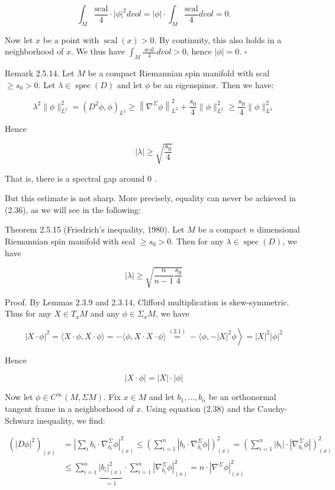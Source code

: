 \documentclass[10pt, letterpaper]{article}
\begin{document}
$$
\int_{M} \frac{\mathrm{scal}}{4} \cdot|\phi|^{2} d v o l=|\phi| \cdot \int_{M} \frac{\mathrm{scal}}{4} d v o l=0 .
$$

Now let $x$ be a point with $\operatorname{scal}(x)>0$. By continuity, this also holds in a neighborhood of $x$. We thus have $\int_{M} \frac{\text { scal }}{4} d v o l>0$, hence $|\phi|=0$. \(\square\)

Remark 2.5.14. Let $M$ be a compact Riemannian spin manifold with scal $\geq s_{0}>0$. Let $\lambda \in \operatorname{spec}(D)$ and let $\phi$ be an eigenspinor. Then we have:

$$
\lambda^{2}\|\phi\|_{L^{2}}^{2}=\left(D^{2} \phi, \phi\right)_{L^{2}} \geq\left\|\nabla^{\Sigma} \phi\right\|_{L^{2}}^{2}+\frac{s_{0}}{4}\|\phi\|_{L^{2}}^{2} \geq \frac{s_{0}}{4}\|\phi\|_{L^{2}}^{2}
$$

Hence

$$
|\lambda| \geq \sqrt{\frac{s_{0}}{4}}
$$

That is, there is a spectral gap around 0 .

But this estimate is not sharp. More precisely, equality can never be achieved in (2.36), as we will see in the following:

Theorem 2.5.15 (Friedrich's inequality, 1980). Let $M$ be a compact $n$ dimensional Riemannian spin manifold with scal $\geq s_{0}>0$. Then for any $\lambda \in \operatorname{spec}(D)$, we have

$$
|\lambda| \geq \sqrt{\frac{n}{n-1} \frac{s_{0}}{4}}
$$

Proof. By Lemmas 2.3.9 and 2.3.14, Clifford multiplication is skew-symmetric. Thus for any $X \in T_{x} M$ and any $\phi \in \Sigma_{x} M$, we have

$$
\left.|X \cdot \phi|^{2}=\langle X \cdot \phi, X \cdot \phi\rangle=-\langle\phi, X \cdot X \cdot \phi\rangle \stackrel{(2.1)}{=}-\left.\langle\phi,-| X\right|^{2} \phi\right\rangle=|X|^{2}|\phi|^{2}
$$

Hence

$$
|X \cdot \phi|=|X| \cdot|\phi|
$$

Now let $\phi \in C^{\infty}(M, \Sigma M)$. Fix $x \in M$ and let $b_{1}, \ldots, b_{n}$ be an orthonormal tangent frame in a neighborhood of $x$. Using equation (2.38) and the Cauchy-Schwarz inequality, we find:

$$
\begin{aligned}
\left(|D \phi|^{2}\right)_{(x)} & =\left|\sum_{i} b_{i} \cdot \nabla_{b_{i}}^{\Sigma} \phi\right|_{(x)}^{2} \leq\left(\sum_{i=1}^{n}\left|b_{i} \cdot \nabla_{b_{i}}^{\Sigma} \phi\right|\right)_{(x)}^{2}=\left(\sum_{i=1}^{n}\left|b_{i}\right| \cdot\left|\nabla_{b_{i}}^{\Sigma} \phi\right|\right)_{(x)}^{2} \\
& \leq \sum_{i=1}^{n} \underbrace{\left|b_{i}\right|_{(x)}^{2}}_{=1} \cdot \sum_{i=1}^{n}\left|\nabla_{b_{i}}^{\Sigma} \phi\right|_{(x)}^{2}=n \cdot\left|\nabla^{\Sigma} \phi\right|_{(x)}^{2}
\end{aligned}
$$
\end{document}
